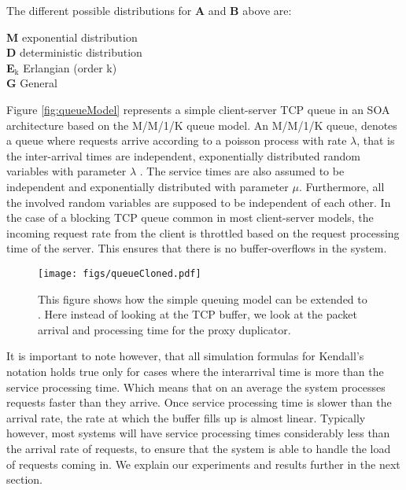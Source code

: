 \noindent The different possible distributions for \textbf{A} and \textbf{B} above are:

\begin{framed}
	\noindent \textbf{M} exponential distribution\\
	\textbf{D} deterministic distribution\\
	\textbf{E$_{\text{k}}$} Erlangian (order k)\\
	\textbf{G} General
\end{framed}



Figure \ref{fig:queueModel} represents a simple client-server TCP queue in an SOA architecture based on the M/M/1/K queue model.
An M/M/1/K queue, denotes a queue where requests arrive according to a poisson process with rate $\lambda$, that is the inter-arrival times are independent, exponentially distributed random variables with parameter $\lambda$ .
The service times are also assumed to be independent and exponentially distributed with parameter $\mu$. 
Furthermore, all the involved random variables are supposed to be independent of each other.
In the case of a blocking TCP queue common in most client-server models, the incoming request rate from the client is throttled based on the request processing time of the server. 
This ensures that there is no buffer-overflows in the system.

\begin{figure}[h]
	\begin{center}
		\texttt{[image: figs/queueCloned.pdf]}
		\caption{This figure shows how the simple queuing model can be extended to \parikshan. Here instead of looking at the TCP buffer, we look at the packet arrival and processing time for the proxy duplicator.}
		\label{fig:queueClonedModel}
	\end{center}
\end{figure}

It is important to note however, that all simulation formulas for Kendall's notation holds true only for cases where the interarrival time is more than the service processing time. 
Which means that on an average the system processes requests faster than they arrive. 
Once service processing time is slower than the arrival rate, the rate at which the buffer fills up is almost linear. 
Typically however, most systems will have service processing times considerably less than the arrival rate of requests, to ensure that the system is able to handle the load of requests coming in.
We explain our experiments and results further in the next section.

